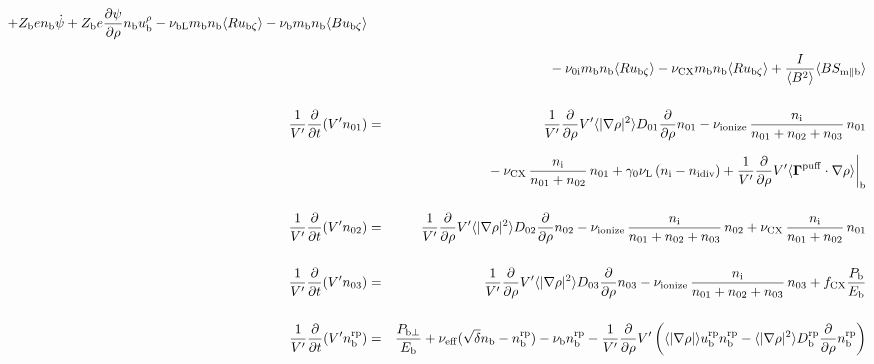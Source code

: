 \documentclass[11pt]{article}
\def\bvec#1{\leavevmode\hbox{\boldmath$#1$}}
\let\vec=\bvec
\def\r#1{{\rm#1}}
\def\aves#1{\langle#1\rangle}
\def\dd#1#2{\frac{\partial #1}{\partial #2}}
\def\para{\parallel}
\def\ddrho{\frac{\partial}{\partial\rho}}
\def\ddV{\frac{\partial}{\partial V}}
\def\mi{m_\r{i}}
\def\mb{m_\r{b}}
\def\nee{n_\r{e}}
\def\ni{n_\r{i}}
\def\nb{n_\r{b}}
\def\nna{n_{01}}
\def\nnb{n_{02}}
\def\nnc{n_{03}}
\def\Te{T_\r{e}}
\def\Zi{Z_\r{i}}
\def\Zb{Z_\r{b}}
\def\Pb{P_\r{b}}
\def\Eb{E_\r{b}}
\def\uezt{u_{\r{e}\zeta}}
\def\ubzt{u_{\r{b}\zeta}}
\def\uepara{u_{\r{e}\para}}
\def\ubrho{u_\r{b}^\rho}
\def\bri{\aves{B^2}\aves{R^2} - I^2}
\def\ddt{\frac{\partial}{\partial t}}
\def\De{D_\r{e}}
\def\nbrp{n_\r{b}^\r{rp}}
\def\Pbperp{P_{\r{b}\perp}}
\def\nueff{\nu_\r{eff}}
\def\ubrp{u_\r{b}^\r{rp}}
\def\Dbrp{D_\r{b}^\r{rp}}
\def\fCX{f_\r{CX}}
\def\nuni{\nu_\r{0i}}
\def\nuL{\nu_\r{L}}
\def\nuCX{\nu_\r{CX}}
\def\nuion{\nu_\r{ionize}}
\def\nub{\nu_\r{b}}
\def\nidiv{n_\r{idiv}}
\def\nuOL{\nu_\r{OL}}
\def\nubL{\nu_\r{bL}}
\def\red#1{\textcolor{red}{#1}}
\begin{document}
\begin{eqnarray}
%
  + \Zb e              \nb \dot{\psi}
%
  + \Zb e \dd{\psi}{\rho} \nb \ubrho
%
%
  - \nubL \mb \nb \aves{R \ubzt}
%
  - \nub  \mb \nb \aves{B \ubzt}
\nonumber\\[2.5mm]&&{}
%
  - \nuni \mb \nb \aves{R \ubzt}
%
  - \nuCX \mb \nb \aves{R \ubzt}
%
%
  + \frac{I}{\aves{B^2}} \aves{B S_{\r{m}\para\r{b}}}
%
\\[5mm]
  \frac{1}{V'} \ddt (V' \nna) &=& 
%
    \frac{1}{V'} \ddrho V' \aves{|\nabla\rho|^2} D_{01} \ddrho \nna
%
  - \nuion\, \frac{\ni}{\nna + \nnb + \nnc}\, \nna
%
\nonumber\\[2.5mm]&&{}
  - \nuCX\, \frac{\ni}{\nna + \nnb}\, \nna
%
  + \gamma_0 \nuL \, (\ni - \nidiv)
%
  + \frac{1}{V'} \ddrho V' \aves{\vec{\Gamma}^\r{puff}\cdot\nabla\rho}\biggr|_\r{b}
\\[5mm]
  \frac{1}{V'} \ddt (V' \nnb) &=& 
%
    \frac{1}{V'} \ddrho V' \aves{|\nabla\rho|^2} D_{02} \ddrho \nnb
%
  - \nuion\, \frac{\ni}{\nna + \nnb + \nnc}\, \nnb
%
  + \nuCX\, \frac{\ni}{\nna + \nnb}\, \nna
%
\\[5mm]
  \frac{1}{V'} \ddt (V' \nnc) &=& 
%
    \frac{1}{V'} \ddrho V' \aves{|\nabla\rho|^2} D_{03} \ddrho \nnc
%
  - \nuion\, \frac{\ni}{\nna + \nnb + \nnc}\, \nnc
%
  + \fCX \frac{\Pb}{\Eb}
\\[5mm]
  \frac{1}{V'} \ddt (V' \nbrp) &=&
%
    \frac{\Pbperp}{\Eb}
%
  + \nueff (\sqrt{\delta} \nb - \nbrp)
%
  - \nub \nbrp
%
  - \frac{1}{V'} \ddrho V' \left( \aves{|\nabla\rho|} \ubrp \nbrp - \aves{|\nabla\rho|^2} \Dbrp \ddrho \nbrp \right)
%
\end{eqnarray}

\bigskip
\end{document}

